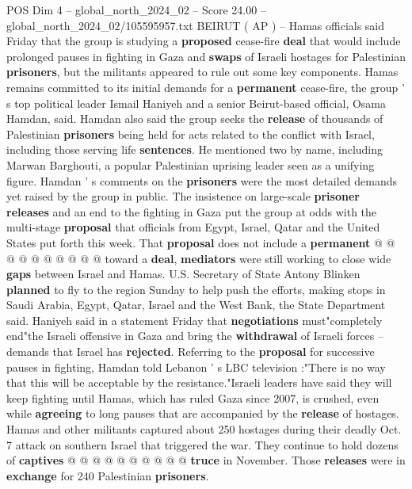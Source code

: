 \begin{textsample}{POS Dim 4 – global\_north\_2024\_02 – Score 24.00 – global\_north\_2024\_02/105595957.txt}  \label{ex:f4_pos_177}
BEIRUT ( AP ) -- Hamas officials said Friday that the group is studying a \textbf{proposed} cease-fire \textbf{deal} that would include prolonged pauses in fighting in Gaza and \textbf{swaps} of Israeli hostages for Palestinian \textbf{prisoners}, but the militants appeared to rule out some key components.
Hamas remains committed to its initial demands for a \textbf{permanent} cease-fire, the group ' s top political leader Ismail Haniyeh and a senior Beirut-based official, Osama Hamdan, said.
Hamdan also said the group seeks the \textbf{release} of thousands of Palestinian \textbf{prisoners} being held for acts related to the conflict with Israel, including those serving life \textbf{sentences}.
He mentioned two by name, including Marwan Barghouti, a popular Palestinian uprising leader seen as a unifying figure.
Hamdan ' s comments on the \textbf{prisoners} were the most detailed demands yet raised by the group in public.
The insistence on large-scale \textbf{prisoner} \textbf{releases} and an end to the fighting in Gaza put the group at odds with the multi-stage \textbf{proposal} that officials from Egypt, Israel, Qatar and the United States put forth this week.
That \textbf{proposal} does not include a \textbf{permanent} @ @ @ @ @ @ @ @ @ @ toward a \textbf{deal}, \textbf{mediators} were still working to close wide \textbf{gaps} between Israel and Hamas.
U.S.
Secretary of State Antony Blinken \textbf{planned} to fly to the region Sunday to help push the efforts, making stops in Saudi Arabia, Egypt, Qatar, Israel and the West Bank, the State Department said.
Haniyeh said in a statement Friday that \textbf{negotiations} must"completely end"the Israeli offensive in Gaza and bring the \textbf{withdrawal} of Israeli forces -- demands that Israel has \textbf{rejected}.
Referring to the \textbf{proposal} for successive pauses in fighting, Hamdan told Lebanon ' s LBC television :"There is no way that this will be acceptable by the resistance."Israeli leaders have said they will keep fighting until Hamas, which has ruled Gaza since 2007, is crushed, even while \textbf{agreeing} to long pauses that are accompanied by the \textbf{release} of hostages.
Hamas and other militants captured about 250 hostages during their deadly Oct. 7 attack on southern Israel that triggered the war.
They continue to hold dozens of \textbf{captives} @ @ @ @ @ @ @ @ @ @ \textbf{truce} in November.
Those \textbf{releases} were in \textbf{exchange} for 240 Palestinian \textbf{prisoners}.

\end{textsample}
